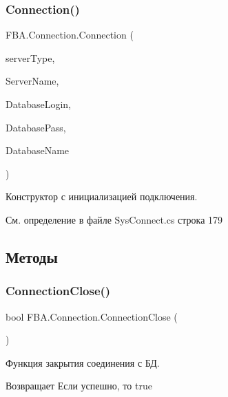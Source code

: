 \subsubsection{\texorpdfstring{Connection()}{Connection()}\hspace{0.1cm}{\footnotesize\ttfamily [2/2]}}
{\footnotesize\ttfamily F\+B\+A.\+Connection.\+Connection (\begin{DoxyParamCaption}\item[{\mbox{\hyperlink{namespace_f_b_a_a54b34d51226fe01d01f79d9fcb237413}{Server\+Type}}}]{server\+Type,  }\item[{string}]{Server\+Name,  }\item[{string}]{Database\+Login,  }\item[{string}]{Database\+Pass,  }\item[{string}]{Database\+Name }\end{DoxyParamCaption})}



Конструктор с инициализацией подключения. 



См. определение в файле Sys\+Connect.\+cs строка 179



\subsection{Методы}
\mbox{\label{class_f_b_a_1_1_connection_a766238aedcab93fcd7d4836db4550e31}} 
\subsubsection{\texorpdfstring{Connection\+Close()}{ConnectionClose()}}
{\footnotesize\ttfamily bool F\+B\+A.\+Connection.\+Connection\+Close (\begin{DoxyParamCaption}{ }\end{DoxyParamCaption})}



Функция закрытия соединения с БД. ~\newline


\begin{DoxyReturn}{Возвращает}
Если успешно, то true
\end{DoxyReturn}



